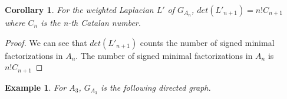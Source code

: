 \documentclass[11pt]{amsart}
\newtheorem{cor}[thm]{Corollary}%
\newtheorem{exa}[thm]{Example}%
\begin{document}
\begin{cor}\label{thm H}
    For the weighted Laplacian $L'$ of $G_{A_n}$, $det(L'_{n+1})=n!C_{n+1}$ where $C_n$ is the n-th Catalan number.
\end{cor}

\begin{proof}
    We can see that $det(L'_{n+1})$ counts the number of signed minimal factorizations in $A_n$. The number of signed minimal factorizations in $A_n$ is $n!C_{n+1}$
\end{proof}

\begin{exa} For $A_3$, $G_{A_3}$ is the following directed graph.
\begin{center}
\begin{tikzpicture}[x=0.75pt,y=0.75pt,yscale=-1,xscale=1]


\end{tikzpicture}
\end{center}
\end{exa}
\end{document}
